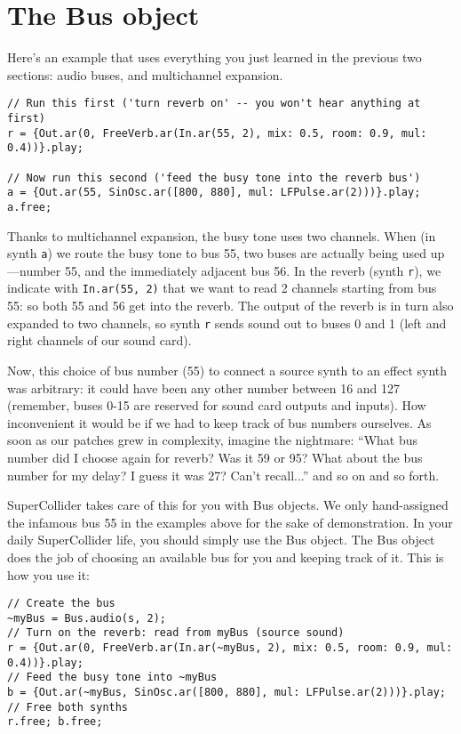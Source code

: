 \section{The Bus object}
\label{sec:busobject}

Here's an example that uses everything you just learned in the previous two sections: audio buses, and multichannel expansion.

 
\begin{lstlisting}[style=SuperCollider-IDE, basicstyle=\scttfamily\footnotesize]
// Run this first ('turn reverb on' -- you won't hear anything at first)
r = {Out.ar(0, FreeVerb.ar(In.ar(55, 2), mix: 0.5, room: 0.9, mul: 0.4))}.play;

// Now run this second ('feed the busy tone into the reverb bus')
a = {Out.ar(55, SinOsc.ar([800, 880], mul: LFPulse.ar(2)))}.play;
a.free;
\end{lstlisting}
 

Thanks to multichannel expansion, the busy tone uses two channels. When (in synth \texttt{a}) we route the busy tone to bus 55, two buses are actually being used up---number 55, and the immediately adjacent bus 56. In the reverb (synth \texttt{r}), we indicate with \texttt{In.ar(55, 2)} that we want to read 2 channels starting from bus 55: so both 55 and 56 get into the reverb. The output of the reverb is in turn also expanded to two channels, so synth \texttt{r} sends sound out to buses 0 and 1 (left and right channels of our sound card).

Now, this choice of bus number (55) to connect a source synth to an effect synth was arbitrary: it could have been any other number between 16 and 127 (remember, buses 0-15 are reserved for sound card outputs and inputs). How inconvenient it would be if we had to keep track of bus numbers ourselves. As soon as our patches grew in complexity, imagine the nightmare: ``What bus number did I choose again for reverb? Was it 59 or 95? What about the bus number for my delay? I guess it was 27? Can't recall...'' and so on and so forth.

SuperCollider takes care of this for you with Bus objects. We only hand-assigned the infamous bus 55 in the examples above for the sake of demonstration. In your daily SuperCollider life, you should simply use the Bus object. The Bus object does the job of choosing an available bus for you and keeping track of it. This is how you use it:

 
\begin{lstlisting}[style=SuperCollider-IDE, basicstyle=\scttfamily\footnotesize]
// Create the bus
~myBus = Bus.audio(s, 2);
// Turn on the reverb: read from myBus (source sound)
r = {Out.ar(0, FreeVerb.ar(In.ar(~myBus, 2), mix: 0.5, room: 0.9, mul: 0.4))}.play;
// Feed the busy tone into ~myBus
b = {Out.ar(~myBus, SinOsc.ar([800, 880], mul: LFPulse.ar(2)))}.play;
// Free both synths
r.free; b.free;
\end{lstlisting}
 

